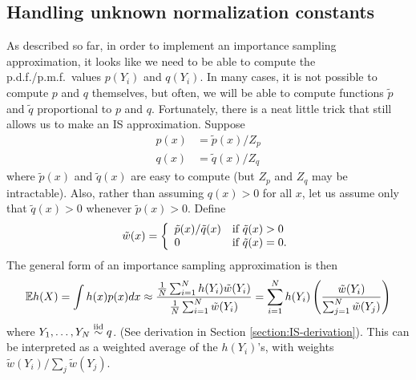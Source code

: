 \documentclass[12pt]{article}
\begin{document}
\subsection{Handling unknown normalization constants}
\label{section:unnormalized}
As described so far, in order to implement an importance sampling approximation, it looks like we need to be able to compute the p.d.f./p.m.f.\ values $p(Y_i)$ and $q(Y_i)$. In many cases, it is not possible to compute $p$ and $q$ themselves, but often, we will be able to compute functions $\tilde p$ and $\tilde q$ proportional to $p$ and $q$. Fortunately, there is a neat little trick that still allows us to make an IS approximation. Suppose
\begin{align*}
p(x) &= \tilde p(x)/Z_p\\
q(x) &= \tilde q(x)/Z_q
\end{align*}
where $\tilde p(x)$ and $\tilde q(x)$ are easy to compute (but $Z_p$ and $Z_q$ may be intractable). Also, rather than assuming $q(x)>0$ for all $x$, let us assume only that $\tilde q(x)>0$ whenever $\tilde p(x)>0$. Define
$$\tilde w(x) = \left\{ \begin{array}{ll} \tilde p(x)/\tilde q(x) & \mbox{if } \tilde q(x)>0 \\ 0 & \mbox{if } \tilde q(x)=0. \end{array} \right.$$
The general form of an importance sampling approximation is then
\begin{align}\label{equation:general-IS}
\mathbb{E} h(X) = \int h(x)p(x)d x \approx\frac{\frac{1}{N}\sum_{i = 1}^N h(Y_i) \tilde w(Y_i)}{\frac{1}{N}\sum_{i = 1}^N \tilde w(Y_i)}
= \sum_{i = 1}^N h(Y_i) \left(\frac{\tilde w(Y_i)}{\sum_{j = 1}^N \tilde w(Y_j)}\right)
\end{align}
where $Y_1,\dotsc,Y_N\stackrel{\mathrm{iid}}{\sim} q$. (See derivation in Section \ref{section:IS-derivation}). This can be interpreted as a weighted average of the $h(Y_i)$'s, with weights $\tilde w(Y_i)/\sum_j \tilde w(Y_j)$. 
\end{document}
